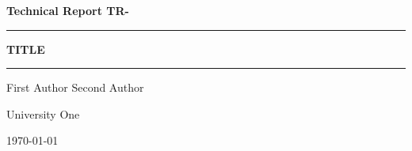 \documentclass[11pt]{article}
\begin{document}
\begin{titlepage}
  \vspace*{3cm}
  {\color{blue!55!black}\large\bfseries Technical Report TR-\the{}\par}
  \vspace{1cm}
  \rule{\linewidth}{0.6pt}\par\vspace{0.6cm}
  {\Huge\bfseries {{TITLE}}\par}
  \vspace{0.6cm}\rule{\linewidth}{0.6pt}\par
  \vspace{1.5cm}
  {\Large First Author \quad Second Author\par}
  \vspace{0.4cm}
  {\large University One\par}
  \vfill
  \begin{abstract}
  One paragraph: the problem, what you did, what you found, and why it matters. Keep it to about 150 words and avoid citations here.
  \end{abstract}
  \vspace{1cm}
  {\large\today\par}
\end{titlepage}

\tableofcontents
\newpage






\end{document}
